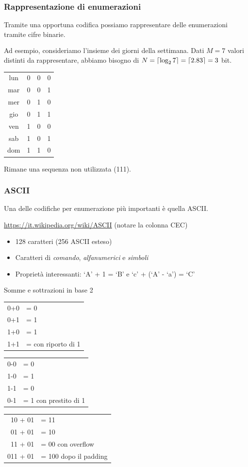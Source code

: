 \documentclass[aspectratio=169, ]{beamer}
\DeclarePairedDelimiter{\ceil}{\lceil}{\rceil}
\begin{document}
\begin{frame}
\frametitle{Rappresentazione di enumerazioni}
Tramite una opportuna codifica possiamo rappresentare delle enumerazioni tramite cifre binarie.

Ad esempio, consideriamo l'insieme dei giorni della settimana. Dati $M=7$ valori distinti da rappresentare, abbiamo bisogno di $N=\ceil{\log_2 7}=\ceil{2.83}=3$ bit.

\begin{table}[h]
	\begin{tabular}{cccc}
		lun&0&0&0\\
		mar&0&0&1\\
		mer&0&1&0\\
		gio&0&1&1\\
		ven&1&0&0\\
		sab&1&0&1\\
		dom&1&1&0
	\end{tabular}
\end{table}

Rimane una sequenza non utilizzata (111).
\end{frame}

\begin{frame}
\frametitle{ASCII}
Una delle codifiche per enumerazione più importanti è quella ASCII.

\href{https://it.wikipedia.org/wiki/ASCII}{https://it.wikipedia.org/wiki/ASCII} (notare la colonna CEC)

\begin{itemize}
\item 128 caratteri (256 ASCII esteso)
\item Caratteri di \emph{comando}, \emph{alfanumerici} e \emph{simboli}
\item Proprietà interessanti: `A' + 1 = `B' e `c' + (`A' - `a') = `C'
\end{itemize}
\end{frame}

\begin{frame}{Somme e sottrazioni in base 2}
	\begin{tabular}{r|l}
		0+0 & = 0 \\
		0+1 & = 1 \\
		1+0 & = 1 \\
		1+1 & = \pause 0 con \alert{riporto} di 1
	\end{tabular}
    \pause
\hspace{2cm}
	\begin{tabular}{r|l}
		0-0 & = 0 \\
		1-0 & = 1 \\
		1-1 & = 0 \\
		0-1 & = 1 con \alert{prestito} di 1
	\end{tabular}

\pause
\vspace{1cm}
	\begin{tabular}{r|l}
		 10 + 01 & = 11 \\
		 01 + 01 & = 10 \\
		 11 + 01 & = 00 con \alert{overflow} \\
		 011 + 01 & = 100 dopo il \alert{padding}
 	\end{tabular}
\end{frame}
\end{document}
